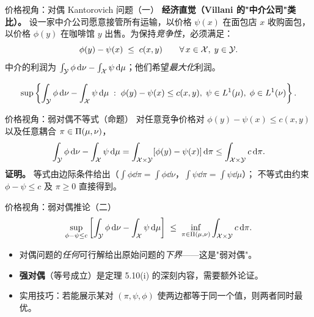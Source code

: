 \begin{frame}{价格视角：对偶 Kantorovich 问题（一）}
  \textbf{经济直觉（Villani 的"中介公司"类比）。}
  设一家中介公司愿意接管所有运输，以价格 $\psi(x)$ 在面包店 $x$ 收购面包，
  以价格 $\phi(y)$ 在咖啡馆 $y$ 出售。为保持\emph{竞争性}，必须满足：
  \[
    \phi(y) - \psi(x) \;\le\; c(x,y) \qquad \forall\, x\in\mathcal{X},\; y\in\mathcal{Y}.
  \]
  中介的利润为 $\int_{\mathcal{Y}}\phi\,\mathrm{d}\nu - \int_{\mathcal{X}}\psi\,\mathrm{d}\mu$；他们希望\emph{最大化}利润。

  \medskip
  \[
    \sup\left\{\int_{\mathcal{Y}}\phi\,\mathrm{d}\nu - \int_{\mathcal{X}}\psi\,\mathrm{d}\mu \;:\;
    \phi(y)-\psi(x)\le c(x,y),\; \psi\in L^1(\mu),\; \phi\in L^1(\nu)\right\}.
  \]

\end{frame}

\begin{frame}{价格视角：弱对偶不等式（命题）}
  对任意竞争价格对 $\phi(y)-\psi(x)\le c(x,y)$ 以及任意耦合 $\pi\in\Pi(\mu,\nu)$，
  \[
    \int_{\mathcal{Y}}\phi\,\mathrm{d}\nu - \int_{\mathcal{X}}\psi\,\mathrm{d}\mu
    = \int_{\mathcal{X}\times\mathcal{Y}}[\phi(y)-\psi(x)]\,\mathrm{d}\pi
    \le \int_{\mathcal{X}\times\mathcal{Y}} c\,\mathrm{d}\pi.
  \]
  \textbf{证明。} 等式由边际条件给出（$\int\phi\dd\pi=\int\phi\dd\nu$，$\int\psi\dd\pi=\int\psi\dd\mu$）；
  不等式由约束 $\phi-\psi\le c$ 及 $\pi\ge0$ 直接得到。

\end{frame}

\begin{frame}{价格视角：弱对偶推论（二）}
  \[
    \sup_{\phi-\psi\le c}\left[\int_{\mathcal{Y}}\phi\,\mathrm{d}\nu-\int_{\mathcal{X}}\psi\,\mathrm{d}\mu\right]
    \;\le\;
    \inf_{\pi\in\Pi(\mu,\nu)}\int_{\mathcal{X}\times\mathcal{Y}} c\,\mathrm{d}\pi.
  \]
  \begin{itemize}
    \item 对偶问题的\emph{任何}可行解给出原始问题的\emph{下界}——这是"弱对偶"。
    \item \textbf{强对偶}（等号成立）是定理 5.10(i) 的深刻内容，需要额外论证。
    \item 实用技巧：若能展示某对 $(\pi,\psi,\phi)$ 使两边都等于同一个值，则两者同时最优。
  \end{itemize}

\end{frame}

